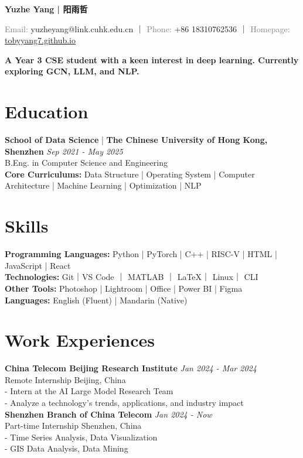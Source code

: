 \documentclass[a4paper,10pt]{article}
\newcommand{\contact}[2]{\noindent\textcolor{gray}{#1:} #2}
\begin{document}
\newcommand{\name}[1]{\noindent\textbf{\LARGE #1}\vspace{0em}}

\begin{center}
    
\name{Yuzhe Yang | 阳雨哲}

\contact{Email}{yuzheyang@link.cuhk.edu.cn} ｜ \contact{Phone}{+86 18310762536} ｜ \contact{Homepage}{\href{https://tobyyang7.github.io/}{tobyyang7.github.io}}

\textbf{A Year 3 CSE student with a keen interest in deep learning. Currently exploring GCN, LLM, and NLP.\\}

\end{center}

\section*{Education}
\textbf{School of Data Science} | \textbf{The Chinese University of Hong Kong, Shenzhen} \hfill \textit{Sep 2021 - May 2025}\\
B.Eng. in Computer Science and Engineering\\
\textbf{Core Curriculums:}
Data Structure | Operating System |  Computer Architecture |  Machine Learning | Optimization |  NLP


\section*{Skills}
\textbf{Programming Languages:} Python | PyTorch | C++ | RISC-V | HTML | JavaScript |  React\\
\textbf{Technologies:} Git｜VS Code ｜ MATLAB ｜ \LaTeX ｜ Linux｜ CLI\\
\textbf{Other Tools:} Photoshop | Lightroom | Office | Power BI | Figma\\
\textbf{Languages:} English (Fluent) | Mandarin (Native)

\section*{Work Experiences}
\textbf{China Telecom Beijing Research Institute} \hfill \textit{Jan 2024 - Mar 2024}\\
Remote Internship \hfill Beijing, China\\
- Intern at the AI Large Model Research Team\\
- Analyze a technology's trends, applications, and industry impact\\
\textbf{Shenzhen Branch of China Telecom} \hfill \textit{Jan 2024 - Now}\\
Part-time Internship \hfill Shenzhen, China\\
- Time Series Analysis, Data Visualization\\
- GIS Data Analysis, Data Mining
\end{document}
